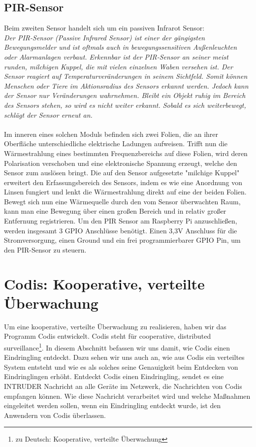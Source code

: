 \documentclass[journal]{IEEEtran}
\begin{document}
\subsection{PIR-Sensor}
Beim zweiten Sensor handelt sich um ein passiven Infrarot Sensor:\\ \textit{Der PIR-Sensor (Passive Infrared Sensor) ist einer der gängigsten Bewegungsmelder und ist oftmals auch in bewegungssensitiven Außenleuchten oder Alarmanlagen verbaut. Erkennbar ist der PIR-Sensor an seiner meist runden, milchigen Kuppel, die mit vielen einzelnen Waben versehen ist. Der Sensor reagiert auf Temperaturveränderungen in seinem Sichtfeld. Somit können Menschen oder Tiere im Aktionsradius des Sensors erkannt werden. Jedoch kann der Sensor nur Veränderungen wahrnehmen. Bleibt ein Objekt ruhig im Bereich des Sensors stehen, so wird es nicht weiter erkannt.  Sobald es sich weiterbewegt, schlägt der Sensor erneut an.}\cite[S. 493]{Raspi}\\ \\ Im inneren eines solchen Moduls befinden sich zwei Folien, die an ihrer Oberfläche unterschiedliche elektrische Ladungen aufweisen. Trifft nun die Wärmestrahlung eines bestimmten Frequenzbereichs auf diese Folien, wird deren Polarisation verschoben und eine elektronische Spannung erzeugt, welche den Sensor zum auslösen bringt. Die auf den Sensor aufgesetzte "milchige Kuppel" erweitert den Erfassungsbereich des Sensors, indem es wie eine Anordnung von Linsen fungiert und lenkt die Wärmestrahlung direkt auf eine der beiden Folien. Bewegt sich nun eine Wärmequelle durch den vom Sensor überwachten Raum, kann man eine Bewegung über einen großen Bereich und in relativ großer Entfernung registrieren.\cite{pir} Um den PIR Sensor am Raspberry Pi anzuschließen, werden insgesamt 3 GPIO Anschlüsse benötigt. Einen 3,3V Anschluss für die Stromversorgung, einen Ground und ein frei programmierbarer GPIO Pin, um den PIR-Sensor zu steuern.


\section{Codis: Kooperative, verteilte Überwachung}

Um eine kooperative, verteilte Überwachung zu realisieren, haben wir das Programm Codis entwickelt. Codis steht für cooperative, distributed surveillance\footnote{zu Deutsch: Kooperative, verteilte Überwachung}. In diesem Abschnitt befassen wir uns damit, wie Codis einen Eindringling entdeckt. Dazu sehen wir uns auch an, wie aus Codis ein verteiltes System entsteht und wie es als solches seine Genauigkeit beim Entdecken von Eindringlingen erhöht. Entdeckt Codis einen Eindringling, sendet es eine \MakeUppercase{intruder} Nachricht an alle Geräte im Netzwerk, die Nachrichten von Codis empfangen können. Wie diese Nachricht verarbeitet wird und welche Maßnahmen eingeleitet werden sollen, wenn ein Eindringling entdeckt wurde, ist den Anwendern von Codis überlassen.
\end{document}
